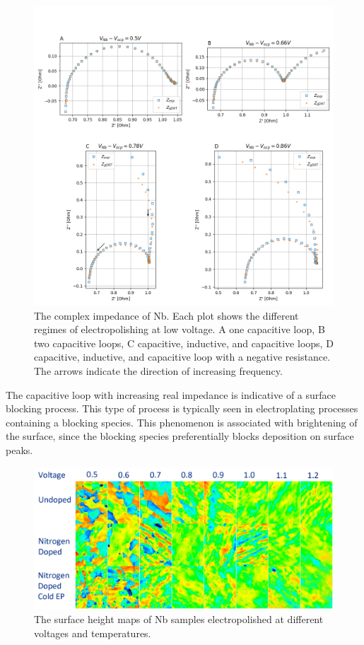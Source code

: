 \documentclass{revtex4-2}
\begin{document}
\begin{figure}[t]
  
  \includegraphics[width=\textwidth]{../figures/nyquist.png}
  \caption{The complex impedance of Nb. Each plot shows the different regimes of electropolishing at low voltage. A one capacitive loop, B two capacitive loops, C capacitive, inductive, and capacitive loops, D capacitive, inductive, and capacitive loop with a negative resistance. The arrows indicate the direction of increasing frequency.}
  \label{fig:nyquistplot}
\end{figure}

The capacitive loop with increasing real impedance is indicative of a surface blocking process. This type of process is typically seen in electroplating processes containing a blocking species. This phenomenon is associated with brightening of the surface, since the blocking species preferentially blocks deposition on surface peaks.


\begin{figure}[t]
    
    \includegraphics[width=\textwidth]{../figures/surface_maps.png}
    \caption{The surface height maps of Nb samples electropolished at different voltages and temperatures.}
    \label{fig:surface_maps}
\end{figure}
\end{document}
